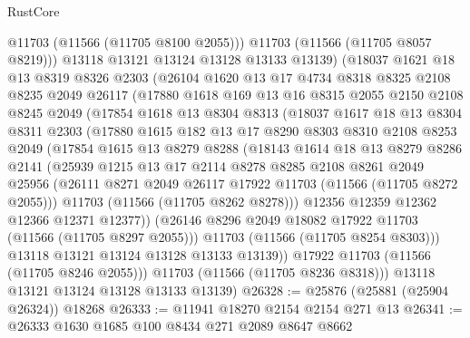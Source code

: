 \begin{lexlean}{RustCore}
\begin{coremodule}
          @11703
          (@11566 (@11705 @8100 @2055)))
        @11703
        (@11566 (@11705 @8057 @8219)))
      @13118
      @13121
      @13124
      @13128
      @13133
      @13139)
    (@18037
      @1621
      @18
      @13
      @8319
      @8326
      @2303
      (@26104
        @1620
        @13
        @17
        @4734
        @8318
        @8325
        @2108
        @8235
        @2049
        @26117
        (@17880
          @1618
          @169
          @13
          @16
          @8315
          @2055
          @2150
          @2108
          @8245
          @2049
          (@17854
            @1618
            @13
            @8304
            @8313
            (@18037
              @1617
              @18
              @13
              @8304
              @8311
              @2303
              (@17880
                @1615
                @182
                @13
                @17
                @8290
                @8303
                @8310
                @2108
                @8253
                @2049
                (@17854
                  @1615
                  @13
                  @8279
                  @8288
                  (@18143
                    @1614
                    @18
                    @13
                    @8279
                    @8286
                    @2141
                    (@25939
                      @1215
                      @13
                      @17
                      @2114
                      @8278
                      @8285
                      @2108
                      @8261
                      @2049
                      @25956
                      (@26111 @8271 @2049 @26117 @17922 @11703 (@11566 (@11705 @8272 @2055)))
                      @11703
                      (@11566 (@11705 @8262 @8278)))
                    @12356
                    @12359
                    @12362
                    @12366
                    @12371
                    @12377))
                (@26146 @8296 @2049 @18082 @17922 @11703 (@11566 (@11705 @8297 @2055)))
                @11703
                (@11566 (@11705 @8254 @8303)))
              @13118
              @13121
              @13124
              @13128
              @13133
              @13139))
          @17922
          @11703
          (@11566 (@11705 @8246 @2055)))
        @11703
        (@11566 (@11705 @8236 @8318)))
      @13118
      @13121
      @13124
      @13128
      @13133
      @13139)
@26328 := @25876 (@25881 (@25904 @26324)) @18268
@26333 := @11941 @18270 @2154 @2154 @271 @13
@26341 := @26333 @1630 @1685 @100 @8434 @271 @2089 @8647 @8662

\end{coremodule}
\end{lexlean}
